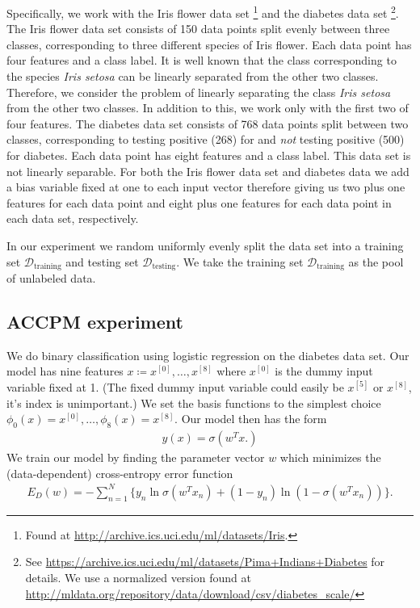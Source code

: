 \documentclass[11pt]{amsart}
\theoremstyle{definition}
\theoremstyle{remark}
\newcommand{\transpose}{T}
\begin{document}
        Specifically, we work with the Iris flower data set \footnote{Found at \url{http://archive.ics.uci.edu/ml/datasets/Iris}.} and the diabetes data set \footnote{See \url{https://archive.ics.uci.edu/ml/datasets/Pima+Indians+Diabetes} for details. We use a normalized version found at \url{http://mldata.org/repository/data/download/csv/diabetes_scale/}}. The Iris flower data set consists of 150 data points split evenly between three classes, corresponding to three different species of Iris flower. Each data point has four features and a class label. It is well known that the class corresponding to the species \emph{Iris setosa} can be linearly separated from the other two classes. Therefore, we consider the problem of linearly separating the class \emph{Iris setosa} from the other two classes. In addition to this, we work only with the first two of four features. The diabetes data set consists of 768 data points split between two classes, corresponding to testing positive (268) for  and \emph{not} testing positive (500) for diabetes. Each data point has eight features and a class label. This data set is not linearly separable. For both the Iris flower data set and diabetes data we add a bias variable fixed at one to each input vector therefore giving us two plus one features for each data point and eight plus one features for each data point in each data set, respectively.  

        In our experiment we random uniformly evenly split the data set into a training set $\mathcal{D}_\text{training}$ and testing set $\mathcal{D}_\text{testing}$. We take the training set $\mathcal{D}_\text{training}$ as the pool of unlabeled data.

    \subsection{ACCPM experiment}
        We do binary classification using logistic regression on the diabetes data set. Our model has nine features $x \coloneqq x^{[0]}, \dots, x^{[8]}$ where $x^{[0]}$ is the dummy input variable fixed at 1. (The fixed dummy input variable could easily be $x^{[5]}$ or $x^{[8]}$, it's index is unimportant.) We set the basis functions to the simplest choice $\phi_0(x) = x^{[0]}, \dots, \phi_8(x) = x^{[8]}$. Our model then has the form
        \begin{align*}
          y(x) = \sigma(w^\transpose x.)
        \end{align*}
        We train our model by finding the parameter vector $w$ which minimizes the (data-dependent) cross-entropy error function \cite[Section 4.3.2]{Bis06}
        \begin{align*}
          E_D(w) =  - \sum_{n=1}^{N} \{y_n \ln \sigma(w^\transpose x_n) + (1 - y_n)\ln(1 - \sigma(w^\transpose x_n))\}.
        \end{align*}
\end{document}
